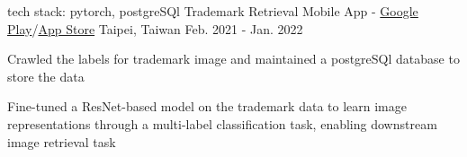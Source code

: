 

\begin{cventries}



  \cventry
    {\color{awesome} tech stack: pytorch, postgreSQl} %
    {Trademark Retrieval Mobile App - \color{awesome}\href{https://play.google.com/store/apps/details?id=meow.logoshot&hl=zh_TW&gl=TW&pli=1}{Google Play}/\href{https://apps.apple.com/tw/app/logo-shot/id1611756574}{App Store}}
    {Taipei, Taiwan} %
    {Feb. 2021 - Jan. 2022} %
    {
      \begin{cvitems} %
        \item {Crawled the labels for trademark image and maintained a postgreSQl database to store the data}
        \item {Fine-tuned a ResNet-based model on the trademark data to learn image representations through a multi-label classification task, enabling downstream image retrieval task}
      \end{cvitems}
    }


\end{cventries}
